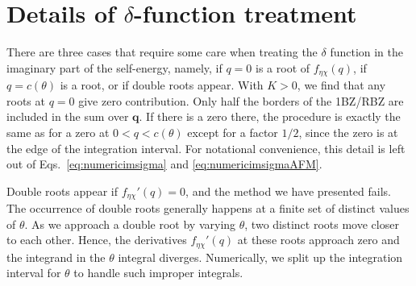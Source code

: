 \documentclass[aps, prb, twocolumn,amsmath,amssymb,floatfix]{revtex4-2}
\begin{document}
\section{Details of \texorpdfstring{$\delta$}{delta}-function treatment} \label{sec:delta} 
There are three cases that require some care when treating the $\delta$ function in the imaginary part of the self-energy, namely, if $q = 0$ is a root of $f_{\eta\chi}(q)$, if $q = c(\theta)$ is a root,  or if double roots appear.
With $K > 0$, we find that any roots at $q=0$ give zero contribution. Only half the borders of the 1BZ/RBZ are included in the sum over $\boldsymbol{q}$. If there is a zero there, the procedure is exactly the same as for a zero at $0 < q < c(\theta)$ except for a factor $1/2$, since the zero is at the edge of the integration interval. For notational convenience, this detail is left out of Eqs.~\eqref{eq:numericimsigma} and \eqref{eq:numericimsigmaAFM}.

Double roots appear if $f_{\eta\chi}'(q) = 0$, and the method we have presented fails. The occurrence of double roots generally happens at a finite set of distinct values of $\theta$. As we approach a double root by varying $\theta$, two distinct roots move closer to each other. Hence, the derivatives $f_{\eta\chi}'(q)$ at these roots approach zero and the integrand in the $\theta$ integral diverges.  
Numerically, we split up the integration interval for $\theta$ to handle such improper integrals. 





\end{document}
